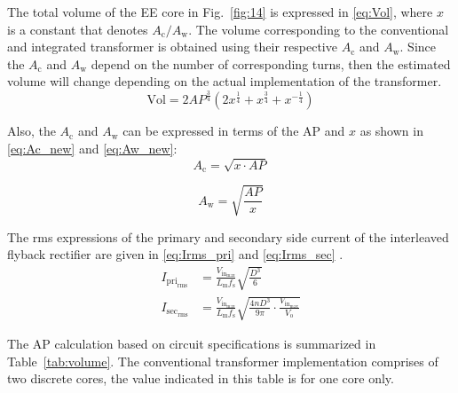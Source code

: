 \documentclass[lettersize,journal]{IEEEtran}
\begin{document}
The total volume of the EE core in Fig.~\ref{fig:14} is expressed in \eqref{eq:Vol}, where $x$ is a constant that denotes $A_{\mathrm{c}}/A_{\mathrm{w}}$. The volume corresponding to the conventional and integrated transformer is obtained using their respective $A_{\mathrm{c}}$ and $A_{\mathrm{w}}$. {\color{red} Since the $A_{\mathrm{c}}$ and $A_{\mathrm{w}}$ depend on the number of corresponding turns, then the estimated volume will change depending on the actual implementation of the transformer.}
\begin{equation}
\label{eq:Vol}
\mathrm{Vol} = 2 AP^{\frac{3}{4}} \left(2 x^{\frac{1}{4}} + x^{\frac{3}{4}} + x^{-\frac{1}{4}}\right)
\end{equation}
{\color{red}
Also, the $A_{\mathrm{c}}$ and $A_{\mathrm{w}}$ can be expressed in terms of the AP and $x$ as shown in \eqref{eq:Ac_new} and \eqref{eq:Aw_new}:
\begin{equation}
\label{eq:Ac_new}
A_{\mathrm{c}} = \sqrt{x \cdot AP}
\end{equation}

\begin{equation}
\label{eq:Aw_new}
A_{\mathrm{w}} = \sqrt{\frac{AP}{x}}
\end{equation}
}
The rms expressions of the primary and secondary side current of the interleaved flyback rectifier are given in \eqref{eq:Irms_pri} and \eqref{eq:Irms_sec} \cite{ref8}.
\begin{align}
I_{\mathrm{pri}_{\mathrm{rms}}} &= \frac{V_{\mathrm{in}_{\mathrm{max}}}}{L_{\mathrm{m}} f_{\mathrm{s}}} \sqrt{\frac{D^3}{6}} \label{eq:Irms_pri}\\
I_{\mathrm{sec}_{\mathrm{rms}}} &= \frac{V_{\mathrm{in}_{\mathrm{max}}}}{L_{\mathrm{m}} f_{\mathrm{s}}} \sqrt{\frac{4 n D^3}{9 \pi} \cdot \frac{V_{\mathrm{in}_{\mathrm{max}}}}{V_{\mathrm{o}}}} \label{eq:Irms_sec}
\end{align}

{\color{red} The AP calculation based on circuit specifications is summarized in Table~\ref{tab:volume}. The conventional transformer implementation comprises of two discrete cores, the value indicated in this table is for one core only.}
\end{document}
